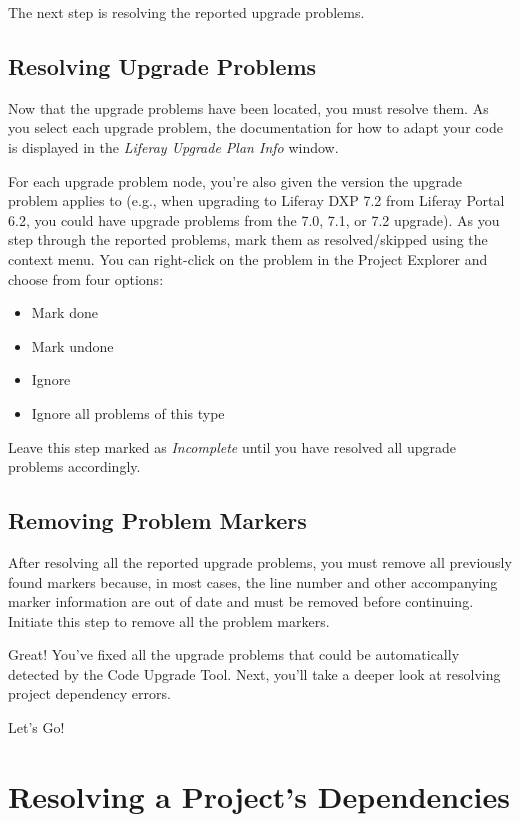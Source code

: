 The next step is resolving the reported upgrade problems.

\section{Resolving Upgrade Problems}\label{resolving-upgrade-problems}

Now that the upgrade problems have been located, you must resolve them.
As you select each upgrade problem, the documentation for how to adapt
your code is displayed in the \emph{Liferay Upgrade Plan Info} window.

For each upgrade problem node, you're also given the version the upgrade
problem applies to (e.g., when upgrading to Liferay DXP 7.2 from Liferay
Portal 6.2, you could have upgrade problems from the 7.0, 7.1, or 7.2
upgrade). As you step through the reported problems, mark them as
resolved/skipped using the context menu. You can right-click on the
problem in the Project Explorer and choose from four options:

\begin{itemize}
\tightlist
\item
  Mark done
\item
  Mark undone
\item
  Ignore
\item
  Ignore all problems of this type
\end{itemize}

Leave this step marked as \emph{Incomplete} until you have resolved all
upgrade problems accordingly.

\section{Removing Problem Markers}\label{removing-problem-markers}

After resolving all the reported upgrade problems, you must remove all
previously found markers because, in most cases, the line number and
other accompanying marker information are out of date and must be
removed before continuing. Initiate this step to remove all the problem
markers.

Great! You've fixed all the upgrade problems that could be automatically
detected by the Code Upgrade Tool. Next, you'll take a deeper look at
resolving project dependency errors.

Let's Go!{}

\chapter{Resolving a Project's
Dependencies}\label{resolving-a-projects-dependencies}

